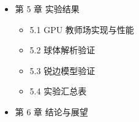 \documentclass[12pt,oneside]{ctexbook}
\begin{document}
\begin{itemize}
\begin{itemize}
    \item 4.3 对比方法
    \item 4.4 评价指标
    \item 4.5 实验协议
    \item 4.6 消融实验
    \item 4.7 预期结果与讨论重点
  \end{itemize}
  \item 第 5 章 实验结果
  \begin{itemize}
    \item 5.1 GPU 教师场实现与性能
    \item 5.2 球体解析验证
    \item 5.3 锐边模型验证
    \item 5.4 实验汇总表
  \end{itemize}
  \item 第 6 章 结论与展望
\end{itemize}
\end{document}
